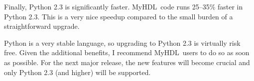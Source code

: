 \documentclass{howto}
\newcommand{\myhdl}{\protect \mbox{MyHDL}}
\begin{document}
Finally, Python 2.3 is significantly faster. \myhdl\ code runs
25--35\% faster in Python 2.3. This is a very nice speedup compared to
the small burden of a straightforward upgrade.

Python is a very stable language, so upgrading to Python 2.3 is
virtually risk free. Given the additional benefits, I recommend
\myhdl\ users to do so as soon as possible. For the next major
release, the new features will become crucial and only Python 2.3 (and
higher) will be supported.
\end{document}
